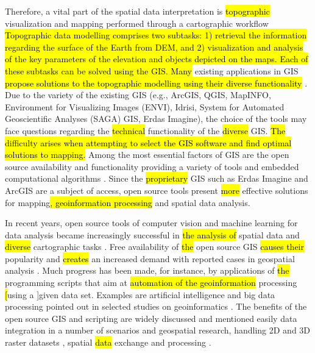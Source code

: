\documentclass[technologies,article,submit,pdftex,moreauthors]{Definitions/mdpi}
\begin{document}
Therefore, a vital part of the spatial data interpretation is \hl{topographic }visualization and mapping performed through a cartographic workflow\hl{ Topographic data modelling comprises two subtasks: 1) retrieval the information regarding the surface of the Earth from DEM, and 2) visualization and analysis of the key parameters of the elevation and objects depicted on the maps. Each of these subtasks can be solved using the GIS. Many} existing applications in GIS \hl{propose solutions to the topographic modelling using their diverse functionality} \cite{Boulton,Buterez,Duncan}. Due to the variety of the existing GIS (e.g., ArcGIS, QGIS, MapINFO, Environment for Visualizing Images (ENVI), Idrisi, System for Automated Geoscientific Analyses (SAGA) GIS, Erdas Imagine), the choice of the tools may face\hl{ }questions regarding the \hl{technical} functionality of the \hl{diverse} GIS. \hl{The difficulty arises when attempting to select the GIS software and find optimal solutions to mapping. }Among the most essential factors of GIS are the open source availability and functionality providing a variety of tools and embedded computational algorithms \cite{agronomy11050952,Armstrong,ijgi5110209}. Since the \hl{proprietary} GIS such as Erdas Imagine and ArcGIS are a subject of access, open source tools present \hl{more }effective solutions for mapping\hl{, geoinformation processing} and spatial data analysis. 

In recent years, open source tools of computer vision and machine learning for data analysis became increasingly successful in \hl{the analysis of} spatial data and \hl{diverse }cartographic tasks \cite{Brovelli}. Free availability of \hl{the }open source GIS \hl{causes their } popularity and \hl{creates} an increased demand with reported cases in\hl{ }geospatial analysis \cite{Christl,Turton}. Much progress has been made, for instance, by applications of \hl{the }programming scripts that aim at \hl{automation of the geoinformation }processing \hl[using a ]given data set. Examples are artificial intelligence and big data processing pointed out in selected studies on geoinformatics \cite{Barnes,Issaka}. The benefits of the open source GIS and scripting are widely discussed and mentioned easily data integration in a number of scenarios and geospatial research, handling 2D and 3D raster datasets \cite{land12010261}, spatial \hl{data} exchange and processing \cite{Ajvazi,Guan,Kralidis}. 
\end{document}
